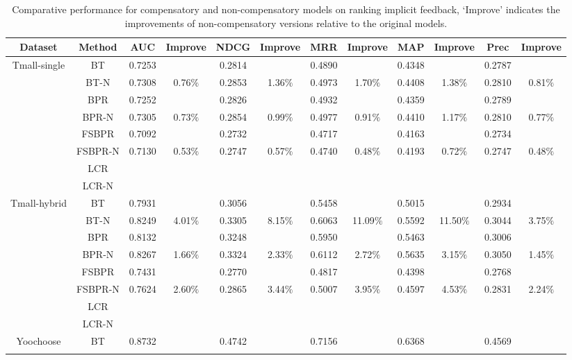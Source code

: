 \documentclass[letterpaper]{article} %
\begin{document}
\begin{table*}[ht]
\tiny
\caption{Comparative performance for compensatory and non-compensatory models on ranking implicit feedback, `Improve' indicates the improvements of non-compensatory versions relative to the original models.}
\begin{center}
\begin{tabular}{|c|c|c|c|c|c|c|c|c|c|c|c|}
\hline
Dataset	& Method	&AUC	&Improve	&NDCG	&Improve	&MRR	&Improve	&MAP	&Improve&	Prec&	Improve\\\hline
\multirow{8}{*}{Tmall-single} &	BT	&0.7253 	&&	0.2814 	&&	0.4890 	&&	0.4348 	&&	0.2787 &\\\cline{2-12}	
	&BT-N	&0.7308 	&0.76$\%$&	0.2853 	&1.36$\%$&	0.4973 &1.70$\%$	&0.4408 &	1.38$\%$&	0.2810 	&0.81$\%$\\\cline{2-12}
	&BPR	&0.7252 	&&	0.2826 &&		0.4932 		&&0.4359 	&&	0.2789 	&\\\cline{2-12}
	&BPR-N	&0.7305 	&0.73$\%$&	0.2854 	&0.99$\%$&	0.4977 &	0.91$\%$&	0.4410 	&1.17$\%$&	0.2810 &	0.77$\%$\\\cline{2-12}
	&FSBPR	&0.7092 	&&	0.2732 	&&	0.4717 	&&	0.4163 	&&	0.2734 	&\\\cline{2-12}
	&FSBPR-N&	0.7130 &	0.53$\%$&	0.2747 &	0.57$\%$&	0.4740 	&0.48$\%$&	0.4193 &	0.72$\%$&	0.2747 	&0.48$\%$\\\cline{2-12}
	&LCR	&&&&&&&&&&\\				\cline{2-12}					
	&LCR-N	&&&&&&&&&&		\\\hline							
\multirow{8}{*}{Tmall-hybrid}	&BT	&0.7931 	&&	0.3056 	&&	0.5458 	&&	0.5015 	&&	0.2934 	&\\\cline{2-12}
	&BT-N	&0.8249 	&4.01$\%$&	0.3305 	&8.15$\%$&	0.6063 	&11.09$\%$	&0.5592 	&11.50$\%$&	0.3044 	&3.75$\%$\\\cline{2-12}
	&BPR	&0.8132 		&&0.3248 	&&	0.5950 	&&	0.5463 	&&	0.3006 	&\\\cline{2-12}
	&BPR-N	&0.8267 &	1.66$\%$	&0.3324 	&2.33$\%$	&0.6112 &	2.72$\%$&	0.5635 &	3.15$\%$&	0.3050 	&1.45$\%$\\\cline{2-12}
	&FSBPR	&0.7431 	&&	0.2770 	&&	0.4817 	&&	0.4398 	&&	0.2768 	&\\\cline{2-12}
	&FSBPR-N	&0.7624 	&2.60$\%$&	0.2865 	&3.44$\%$&	0.5007 &	3.95$\%$&	0.4597 	&4.53$\%$&	0.2831 &	2.24$\%$\\\cline{2-12}
	&LCR	&&&&&&&&&&						\\\cline{2-12}			
	&LCR-N	&&&&&&&&&&							\\\hline		
\multirow{8}{*}{Yoochoose} &	BT	&0.8732 &&		0.4742 	&&	0.7156 	&&	0.6368 	&&	0.4569 	&\\\cline{2-12}

\end{tabular}
\end{center}
\end{table*}
\end{document}
